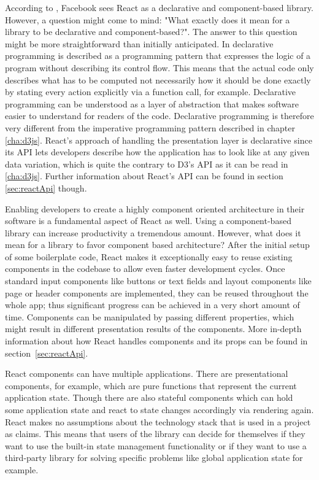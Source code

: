 According to \cite{React}, Facebook sees React as a declarative and component-based library. However, a question might come to mind: "What exactly does it mean for a library to be declarative and component-based?". The answer to this question might be more straightforward than initially anticipated. In \cite{lloyd1994practical} declarative programming is described as a programming pattern that expresses the logic of a program without describing its control flow. This means that the actual code only describes what has to be computed not necessarily how it should be done exactly by stating every action explicitly via a function call, for example. Declarative programming can be understood as a layer of abstraction that makes software easier to understand for readers of the code. Declarative programming is therefore very different from the imperative programming pattern described in chapter \ref{cha:d3js}. React's approach of handling the presentation layer is declarative since its API lets developers describe how the application has to look like at any given data variation, which is quite the contrary to D3's API as it can be read in \ref{cha:d3js}. Further information about React's API can be found in section \ref{sec:reactApi} though.

Enabling developers to create a highly component oriented architecture in their software is a fundamental aspect of React as well. Using a component-based library can increase productivity a tremendous amount. However, what does it mean for a library to favor component based architecture? After the initial setup of some boilerplate code, React makes it exceptionally easy to reuse existing components in the codebase to allow even faster development cycles. Once standard input components like buttons or text fields and layout components like page or header components are implemented, they can be reused throughout the whole app; thus significant progress can be achieved in a very short amount of time. Components can be manipulated by passing different properties, which might result in different presentation results of the components. More in-depth information about how React handles components and its props can be found in section~\ref{sec:reactApi}.

React components can have multiple applications. There are presentational components, for example, which are pure functions that represent the current application state. Though there are also stateful components which can hold some application state and react to state changes accordingly via rendering again. React makes no assumptions about the technology stack that is used in a project as \cite{React} claims. This means that users of the library can decide for themselves if they want to use the built-in state management functionality or if they want to use a third-party library for solving specific problems like global application state for example.

